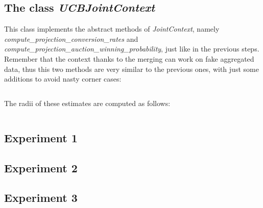 \documentclass[11pt]{article} %
\begin{document}
\subsection{The class \textit{UCBJointContext}}
This class implements the abstract methods of \textit{JointContext}, namely \\ \textit{compute\_projection\_conversion\_rates}
and \textit{compute\_projection\_auction\_winning\_probability}, just like in the previous steps. Remember that the context
thanks to the merging can work on fake aggregated data, thus this two methods are very similar to the previous ones, with
just some additions to avoid nasty corner cases:
\inputminted{python}{code/step7_computation_random_variables.py}
The radii of these estimates are computed as follows:
\inputminted{python}{code/step7_radii_computation.py}



\clearpage
\subsection{Experiment 1}

\clearpage
{\footnotesize}

\clearpage
\subsection{Experiment 2}

\clearpage
{\footnotesize}

\clearpage
\subsection{Experiment 3}

\clearpage
{\footnotesize}


\clearpage
\appendix
\end{document}
